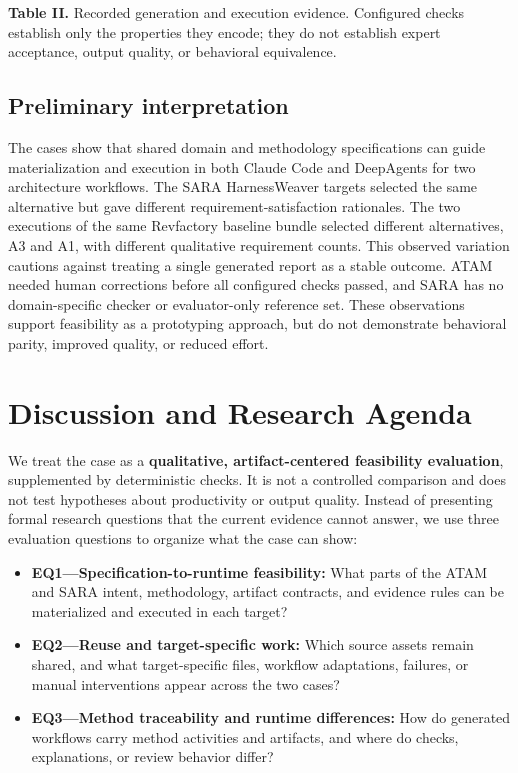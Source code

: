 \documentclass[10pt,conference]{IEEEtran}
\begin{document}
\textbf{Table II.} Recorded generation and execution evidence. Configured checks establish only the properties they encode; they do not establish expert acceptance, output quality, or behavioral equivalence.

\subsection{Preliminary interpretation}

The cases show that shared domain and methodology specifications can guide materialization and execution in both Claude Code and DeepAgents for two architecture workflows. The SARA HarnessWeaver targets selected the same alternative but gave different requirement-satisfaction rationales. The two executions of the same Revfactory baseline bundle selected different alternatives, A3 and A1, with different qualitative requirement counts. This observed variation cautions against treating a single generated report as a stable outcome. ATAM needed human corrections before all configured checks passed, and SARA has no domain-specific checker or evaluator-only reference set. These observations support feasibility as a prototyping approach, but do not demonstrate behavioral parity, improved quality, or reduced effort.

\section{Discussion and Research Agenda}

We treat the case as a \textbf{qualitative, artifact-centered feasibility evaluation}, supplemented by deterministic checks. It is not a controlled comparison and does not test hypotheses about productivity or output quality. Instead of presenting formal research questions that the current evidence cannot answer, we use three evaluation questions to organize what the case can show:

\begin{itemize}

\item
  \textbf{EQ1---Specification-to-runtime feasibility:} What parts of the ATAM and SARA intent, methodology, artifact contracts, and evidence rules can be materialized and executed in each target?
\item
  \textbf{EQ2---Reuse and target-specific work:} Which source assets remain shared, and what target-specific files, workflow adaptations, failures, or manual interventions appear across the two cases?
\item
  \textbf{EQ3---Method traceability and runtime differences:} How do generated workflows carry method activities and artifacts, and where do checks, explanations, or review behavior differ?
\end{itemize}
\end{document}
